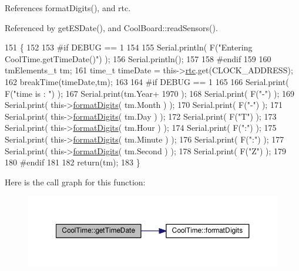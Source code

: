 References format\+Digits(), and rtc.



Referenced by get\+E\+S\+Date(), and Cool\+Board\+::read\+Sensors().


\begin{DoxyCode}
151 \{
152 
153 \textcolor{preprocessor}{#if DEBUG == 1 }
154     
155     Serial.println( F(\textcolor{stringliteral}{"Entering CoolTime.getTimeDate()"}) );
156     Serial.println();
157 
158 \textcolor{preprocessor}{#endif}
159 
160     tmElements\_t tm;
161     time\_t timeDate = this->\hyperlink{classCoolTime_abd38f2384ff90692b1568d9db869412e}{rtc}.get(CLOCK\_ADDRESS);
162     breakTime(timeDate,tm);
163 
164 \textcolor{preprocessor}{#if DEBUG == 1}
165     
166     Serial.print( F(\textcolor{stringliteral}{"time is : "}) );
167     Serial.print(tm.Year+ 1970 );
168     Serial.print( F(\textcolor{stringliteral}{"-"}) );
169     Serial.print( this->\hyperlink{classCoolTime_acd537cd4210d7bde4e1f5c47d2ac0456}{formatDigits}( tm.Month ) );
170     Serial.print( F(\textcolor{stringliteral}{"-"}) );
171     Serial.print( this->\hyperlink{classCoolTime_acd537cd4210d7bde4e1f5c47d2ac0456}{formatDigits}( tm.Day ) );
172     Serial.print( F(\textcolor{stringliteral}{"T"}) );
173     Serial.print( this->\hyperlink{classCoolTime_acd537cd4210d7bde4e1f5c47d2ac0456}{formatDigits}( tm.Hour ) );
174     Serial.print( F(\textcolor{stringliteral}{":"}) );
175     Serial.print( this->\hyperlink{classCoolTime_acd537cd4210d7bde4e1f5c47d2ac0456}{formatDigits}( tm.Minute ) );
176     Serial.print( F(\textcolor{stringliteral}{":"}) );
177     Serial.print( this->\hyperlink{classCoolTime_acd537cd4210d7bde4e1f5c47d2ac0456}{formatDigits}( tm.Second ) );
178     Serial.print( F(\textcolor{stringliteral}{"Z"}) );
179 
180 \textcolor{preprocessor}{#endif}
181     
182     \textcolor{keywordflow}{return}(tm);
183 \}
\end{DoxyCode}
Here is the call graph for this function\+:\nopagebreak
\begin{figure}[H]
\begin{center}
\leavevmode
\includegraphics[width=350pt]{classCoolTime_a7a7501c5ca77dd1248bea704c44f986c_cgraph}
\end{center}
\end{figure}
